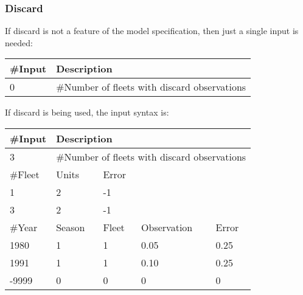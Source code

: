 \subsubsection{Discard}
If discard is not a feature of the model specification, then just a single input is needed:

	\begin{center}
		\begin{tabular}{p{2cm} p{8cm}}
			\#Input & Description\\
			\hline
			0 & \#Number of fleets with discard observations\\
			\hline
		\end{tabular}
	\end{center}
	
\noindent	
If discard is being used, the input syntax is:
	\begin{center}
		\begin{tabular}{p{3cm} p{3cm} p{3cm} p{3cm} p{3cm}}
			\#Input & \multicolumn{4}{l}{Description}\\
			\hline
			3 & \multicolumn{4}{l}{\#Number of fleets with discard observations}\\
			\hline
			\#Fleet & Units & \multicolumn{3}{l}{Error}\\
			\hline
			1 & 2 & \multicolumn{3}{l}{-1}\\
			3 & 2 & \multicolumn{3}{l}{-1}\\
			\#Year & Season & Fleet & Observation & Error \\
			\hline
			1980  & 1 & 1 & 0.05 & 0.25 \\
			1991  & 1 & 1 & 0.10 & 0.25 \\
			-9999 & 0 & 0 & 0    & 0 \\
			\hline
		\end{tabular}
	\end{center}
	
